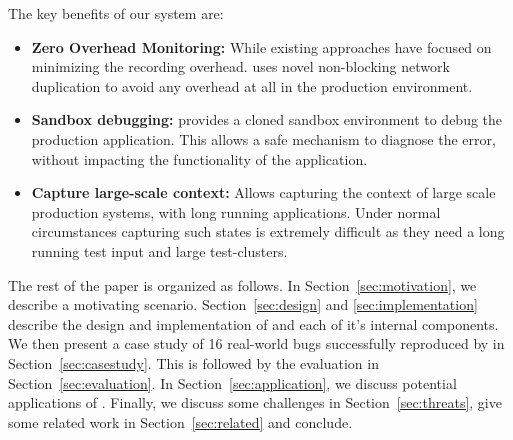 \noindent
The key benefits of our system are:
\begin{itemize}[leftmargin=*,topsep=0pt,itemsep=-1ex,partopsep=1ex,parsep=1ex]
\item \textbf{Zero Overhead Monitoring:} While existing approaches have focused on minimizing the recording overhead. 
\parikshan uses novel non-blocking network duplication to avoid any overhead at all in the production environment.	
\item \textbf{Sandbox debugging:} \parikshan provides a cloned sandbox environment to debug the production application.
This allows a safe mechanism to diagnose the error, without impacting the functionality of the application.
\item \textbf{Capture large-scale context:} Allows capturing the context of large scale production systems, with long running applications. Under normal circumstances capturing such states is extremely difficult as they need a long running test input and large test-clusters.
\end{itemize}

\noindent
The rest of the paper is organized as follows.
In Section~\ref{sec:motivation}, we describe a motivating scenario.
Section~\ref{sec:design} and \ref{sec:implementation} describe the design and implementation of \parikshan and each of it's internal components.
We then present a case study of 16 real-world bugs successfully reproduced by \parikshan in Section~\ref{sec:casestudy}.
This is followed by the evaluation in Section~\ref{sec:evaluation}.
In Section~\ref{sec:application}, we discuss potential applications of \parikshan. 
Finally, we discuss some challenges in Section~\ref{sec:threats}, give some related work in Section~\ref{sec:related} and conclude.
